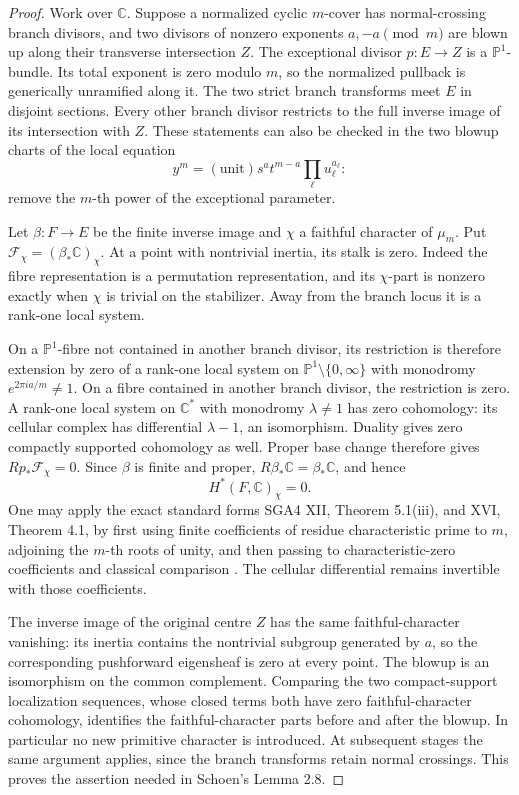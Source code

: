 \begin{proof}
Work over \(\mathbb C\).  Suppose a normalized cyclic \(m\)-cover has
normal-crossing branch divisors, and two divisors of nonzero exponents
\(a,-a\pmod m\) are blown up along their transverse intersection \(Z\).
The exceptional divisor \(p:E\to Z\) is a \(\mathbb P^1\)-bundle.
Its total exponent is zero modulo \(m\), so the normalized pullback is
generically unramified along it.  The two strict branch transforms meet
\(E\) in disjoint sections.  Every other branch divisor restricts to the
full inverse image of its intersection with \(Z\).  These statements can
also be checked in the two blowup charts of the local equation
\[
             y^m=(\text{unit})s^a t^{m-a}\prod_\ell u_\ell^{a_\ell}:
\]
remove the \(m\)-th power of the exceptional parameter.

Let \(\beta:F\to E\) be the finite inverse image and \(\chi\) a faithful
character of \(\mu_m\).  Put
\(\mathscr F_\chi=(\beta_*\mathbb C)_\chi\).
At a point with nontrivial inertia, its stalk is zero.  Indeed the fibre
representation is a permutation representation, and its \(\chi\)-part
is nonzero exactly when \(\chi\) is trivial on the stabilizer.  Away from
the branch locus it is a rank-one local system.

On a \(\mathbb P^1\)-fibre not contained in another branch divisor, its
restriction is therefore extension by zero of a rank-one local system on
\(\mathbb P^1\setminus\{0,\infty\}\) with monodromy
\(e^{2\pi i a/m}\ne1\).  On a fibre contained in another branch divisor,
the restriction is zero.  A rank-one local system on \(\mathbb C^*\) with
monodromy \(\lambda\ne1\) has zero cohomology: its cellular complex has
differential \(\lambda-1\), an isomorphism.  Duality gives zero compactly
supported cohomology as well.  Proper base change therefore gives
\(Rp_*\mathscr F_\chi=0\).  Since \(\beta\) is finite and proper,
\(R\beta_*\mathbb C=\beta_*\mathbb C\), and hence
\[
                            H^*(F,\mathbb C)_\chi=0.
\]
One may apply the exact standard forms SGA4 XII, Theorem 5.1(iii), and
XVI, Theorem 4.1, by first using finite coefficients of residue characteristic
prime to \(m\), adjoining the \(m\)-th roots of unity, and then passing
to characteristic-zero coefficients and classical comparison
\cite{G34:SGA4}.  The cellular differential remains invertible with those
coefficients.

The inverse image of the original centre \(Z\) has the same faithful-character
vanishing: its inertia contains the nontrivial subgroup generated by \(a\),
so the corresponding pushforward eigensheaf is zero at every point.
The blowup is an isomorphism on the common complement.  Comparing the two
compact-support localization sequences, whose closed terms both have zero
faithful-character cohomology, identifies the faithful-character parts
before and after the blowup.  In particular no new primitive character is
introduced.  At subsequent stages the same argument applies, since the
branch transforms retain normal crossings.  This proves the assertion
needed in Schoen's Lemma 2.8.
\end{proof}

